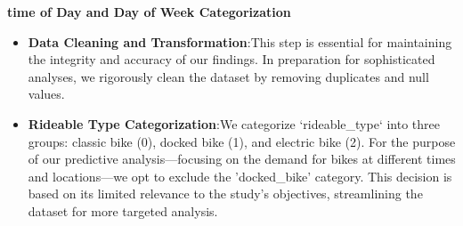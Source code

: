 \documentclass[12pt, a4paper]{article}
\begin{document}
    \textbf{time of Day and Day of Week Categorization}\newline
    \begin{itemize}
        \item \textbf{Data Cleaning and Transformation}:\newline This step is essential for maintaining the integrity and accuracy of our findings. In preparation for sophisticated analyses, we rigorously clean the dataset by removing duplicates and null values.
        \item \textbf{Rideable Type Categorization}:\newline We categorize `rideable\_type` into three groups: classic bike (0), docked bike (1), and electric bike (2).
                        For the purpose of our predictive analysis—focusing on the demand for bikes at different times and locations—we opt to exclude the 'docked\_bike' category.
                        This decision is based on its limited relevance to the study's objectives, streamlining the dataset for more targeted analysis.

    \end{itemize}
\end{document}
